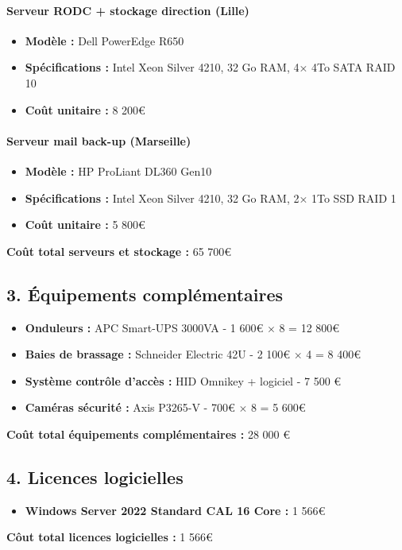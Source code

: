 \documentclass{report}
\begin{document}
\paragraph{Serveur RODC + stockage direction (Lille)}
\begin{itemize}
    \item \textbf{Modèle :} Dell PowerEdge R650 
    \item \textbf{Spécifications :} Intel Xeon Silver 4210, 32 Go RAM, 4× 4To SATA RAID 10
    \item \textbf{Coût unitaire :} 8 200€
\end{itemize}
\paragraph{Serveur mail back-up (Marseille)}
\begin{itemize}
    \item \textbf{Modèle :} HP ProLiant DL360 Gen10
    \item \textbf{Spécifications :} Intel Xeon Silver 4210, 32 Go RAM, 2× 1To SSD RAID 1
    \item \textbf{Coût unitaire :} 5 800€
\end{itemize}
\vspace{0.2cm}
\noindent \textbf{Coût total serveurs et stockage :} 65 700€
\vspace{0.5cm}
\subsection*{3. Équipements complémentaires}
\vspace{0.2cm}
\begin{itemize}
    \item \textbf{Onduleurs :} APC Smart-UPS 3000VA - 1 600€ $\times$ 8 = 12 800€
    \item \textbf{Baies de brassage :} Schneider Electric 42U - 2 100€ $\times$ 4 = 8 400€
    \item \textbf{Système contrôle d'accès :} HID Omnikey + logiciel - 7 500 €
    \item \textbf{Caméras sécurité :} Axis P3265-V - 700€ $\times$ 8 = 5 600€
\end{itemize}
\vspace{0.2cm}
\noindent \textbf{Coût total équipements complémentaires :} 28 000 €
\vspace{0.5cm}
\subsection*{4. Licences logicielles}
\vspace{0.2cm}
\begin{itemize}
    \item \textbf{Windows Server 2022 Standard CAL 16 Core :} 1 566€
\end{itemize}
\vspace{0.2cm}
\noindent \textbf{Côut total licences logicielles :} 1 566€
\vspace{0.5cm}
\end{document}
